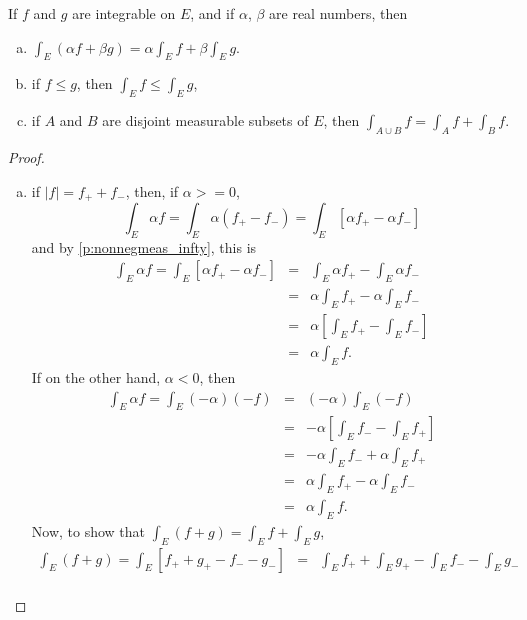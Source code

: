 \begin{pblm}\label{p:conditionsmeasu}%
	If $f$ and $g$ are integrable on $E$, and if $\alpha$, $\beta$ are real 
	numbers, then 
	\begin{enumerate}[(a)]
	\item $\int_E(\alpha f + \beta g) = \alpha \int_Ef + \beta\int_Eg$. 
	\item if $f \le g$, then $\int_Ef \le \int_Eg$, 
	\item if $A$ and $B$ are disjoint measurable subsets of $E$, then 
	$\int_{A\cup B}f = \int_Af + \int_Bf$. 
	\end{enumerate}
\begin{proof} ~
	\begin{enumerate}[(a)]
	\item if $|f|=f_++f_-$, then, if $\alpha >= 0$,
	\begin{equation*}
		\int_E\alpha f = \int_E\alpha(f_+-f_-) = \int_E[\alpha f_+ - \alpha f_-] 
	\end{equation*}
	and by \ref{p:nonnegmeas_infty}, this is 
	\begin{equation*}
	\begin{array}{rcl}
		\int_E\alpha f = \int_E[\alpha f_+ - \alpha f_-] & = & \int_E\alpha f_+ - \int_E \alpha f_- \\
			& = & \alpha\int_E f_+ - \alpha\int_E f_- \\ 
			& = & \alpha\left[\int_Ef_+ - \int_Ef_-\right]\\
			& = & \alpha\int_Ef. 
	\end{array}
	\end{equation*}
	If on the other hand, $\alpha < 0$, then 
	\begin{equation*}
	\begin{array}{rcl}
		\int_E \alpha f = \int_E (-\alpha) (-f) & = & (-\alpha) \int_E (-f) \\
			& = & -\alpha \left[\int_E f_- - \int_E f_+\right]\\
			& = & -\alpha \int_E f_- + \alpha \int_E f_+\\
			& = & \alpha \int_E f_+ - \alpha \int_E f_-\\
			& = & \alpha \int_E f. 
	\end{array}
	\end{equation*}
	Now, to show that $\int_E(f+g) = \int_Ef+\int_Eg$, 
	\begin{equation*}
	\begin{array}{rcl}
		\int_E(f+g) = \int_E[f_++g_+-f_--g_-] &=& \int_Ef_++\int_Eg_+-\int_Ef_--\int_Eg_- \\ 	

\end{array}
\end{equation*}
\end{enumerate}
\end{proof}
\end{pblm}
